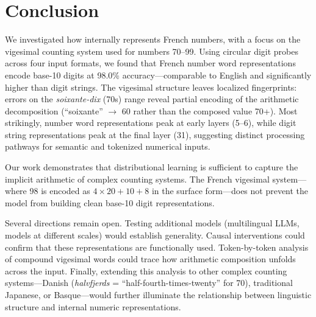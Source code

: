 \section{Conclusion}
\label{sec:conclusion}

We investigated how \mistral internally represents French numbers, with a focus on the vigesimal counting system used for numbers 70--99. Using circular digit probes across four input formats, we found that French number word representations encode base-10 digits at 98.0\% accuracy---comparable to English and significantly higher than digit strings. The vigesimal structure leaves localized fingerprints: errors on the \emph{soixante-dix} (70s) range reveal partial encoding of the arithmetic decomposition (``soixante'' $\to$ 60 rather than the composed value 70+). Most strikingly, number word representations peak at early layers (5--6), while digit string representations peak at the final layer (31), suggesting distinct processing pathways for semantic and tokenized numerical inputs.

Our work demonstrates that distributional learning is sufficient to capture the implicit arithmetic of complex counting systems. The French vigesimal system---where 98 is encoded as $4\times20+10+8$ in the surface form---does not prevent the model from building clean base-10 digit representations.

Several directions remain open. Testing additional models (multilingual LLMs, models at different scales) would establish generality. Causal interventions could confirm that these representations are functionally used. Token-by-token analysis of compound vigesimal words could trace how arithmetic composition unfolds across the input. Finally, extending this analysis to other complex counting systems---Danish (\emph{halvfjerds} = ``half-fourth-times-twenty'' for 70), traditional Japanese, or Basque---would further illuminate the relationship between linguistic structure and internal numeric representations.
